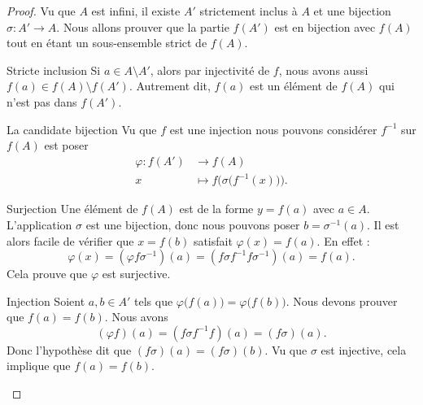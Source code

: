\begin{proof}
    Vu que \( A\) est infini, il existe \( A'\) strictement inclus à \( A\) et une bijection \( \sigma\colon A'\to A\). Nous allons prouver que la partie \( f(A')\) est en bijection avec \( f(A)\) tout en étant un sous-ensemble strict de \( f(A)\).

    \begin{subproof}
        \item[Stricte inclusion]
            Si \( a\in A\setminus A'\), alors par injectivité de \( f\), nous avons aussi \( f(a)\in f(A)\setminus f(A')\). Autrement dit, \( f(a)\) est un élément de \( f(A)\) qui n'est pas dans \( f(A')\).
        \item[La candidate bijection]
            Vu que \( f\) est une injection nous pouvons considérer \( f^{-1}\) sur \( f(A)\) est poser
            \begin{equation}
                \begin{aligned}
                    \varphi\colon f(A')&\to f(A) \\
                    x&\mapsto  f\Big( \sigma\big( f^{-1}(x) \big) \Big).
                \end{aligned}
            \end{equation}
        \item[Surjection]
            Une élément de \( f(A)\) est de la forme \( y=f(a)\) avec \( a\in A\). L'application \( \sigma\) est une bijection, donc nous pouvons poser \( b=\sigma^{-1}(a)\). Il est alors facile de vérifier que \( x=f(b)\) satisfait \( \varphi(x)=f(a)\). En effet :
            \begin{equation}
                \varphi(x)=(\varphi f\sigma^{-1})(a)=(f\sigma f^{-1}f\sigma^{-1})(a)=f(a).
            \end{equation}
            Cela prouve que \( \varphi\) est surjective.
        \item[Injection]
            Soient \( a,b\in A'\) tels que \( \varphi\big( f(a) \big)=\varphi\big( f(b) \big)\). Nous devons prouver que \( f(a)=f(b)\). Nous avons
            \begin{equation}
                (\varphi f)(a)=(f\sigma f^{-1} f)(a)=(f\sigma)(a).
            \end{equation}
            Donc l'hypothèse dit que \( (f\sigma)(a)=(f\sigma)(b)\). Vu que \( \sigma\) est injective, cela implique que \( f(a)=f(b)\).
    \end{subproof}
\end{proof}


